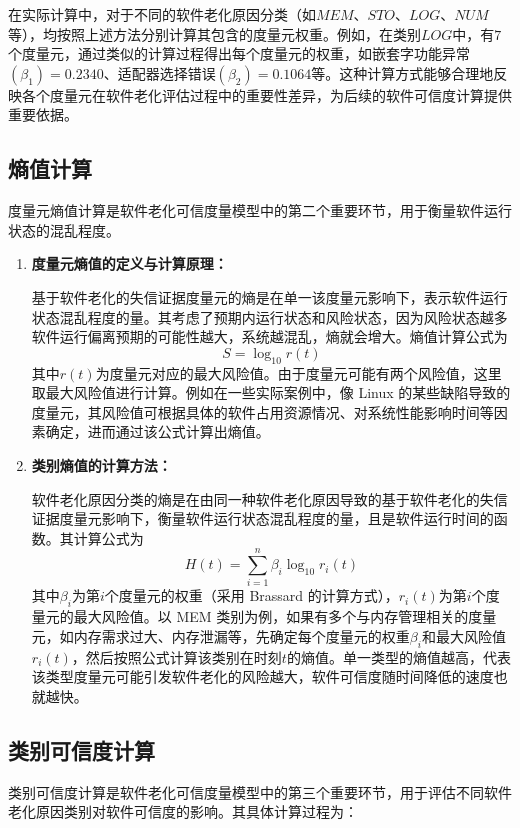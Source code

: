 \documentclass{article}
\begin{document}
\begin{enumerate}
	在实际计算中，对于不同的软件老化原因分类（如\(MEM\)、\(STO\)、\(LOG\)、\(NUM\)等），均按照上述方法分别计算其包含的度量元权重。例如，在类别\(LOG\)中，有\(7\)个度量元，通过类似的计算过程得出每个度量元的权重，如嵌套字功能异常\((\beta_{1}) = 0.2340\)、适配器选择错误\((\beta_{2}) = 0.1064\)等。这种计算方式能够合理地反映各个度量元在软件老化评估过程中的重要性差异，为后续的软件可信度计算提供重要依据。 
\end{enumerate}

\subsection{熵值计算}

度量元熵值计算是软件老化可信度量模型中的第二个重要环节，用于衡量软件运行状态的混乱程度。

\begin{enumerate}
	\item \textbf{度量元熵值的定义与计算原理：}
	
	基于软件老化的失信证据度量元的熵是在单一该度量元影响下，表示软件运行状态混乱程度的量。其考虑了预期内运行状态和风险状态，因为风险状态越多软件运行偏离预期的可能性越大，系统越混乱，熵就会增大。熵值计算公式为$$ S = \log_{10} r(t) $$其中\(r(t)\)为度量元对应的最大风险值。由于度量元可能有两个风险值，这里取最大风险值进行计算。例如在一些实际案例中，像 Linux 的某些缺陷导致的度量元，其风险值可根据具体的软件占用资源情况、对系统性能影响时间等因素确定，进而通过该公式计算出熵值。
	
	\item \textbf{类别熵值的计算方法：}
	
	软件老化原因分类的熵是在由同一种软件老化原因导致的基于软件老化的失信证据度量元影响下，衡量软件运行状态混乱程度的量，且是软件运行时间的函数。其计算公式为$$ H(t)=\sum_{i = 1}^{n}\beta_{i}\log_{10}r_{i}(t) $$其中\(\beta_{i}\)为第\(i\)个度量元的权重（采用 Brassard 的计算方式），\(r_{i}(t)\)为第\(i\)个度量元的最大风险值。以 MEM 类别为例，如果有多个与内存管理相关的度量元，如内存需求过大、内存泄漏等，先确定每个度量元的权重\(\beta_{i}\)和最大风险值\(r_{i}(t)\)，然后按照公式计算该类别在时刻\(t\)的熵值。单一类型的熵值越高，代表该类型度量元可能引发软件老化的风险越大，软件可信度随时间降低的速度也就越快。
\end{enumerate}

\subsection{类别可信度计算}

类别可信度计算是软件老化可信度量模型中的第三个重要环节，用于评估不同软件老化原因类别对软件可信度的影响。其具体计算过程为：
\end{document}
